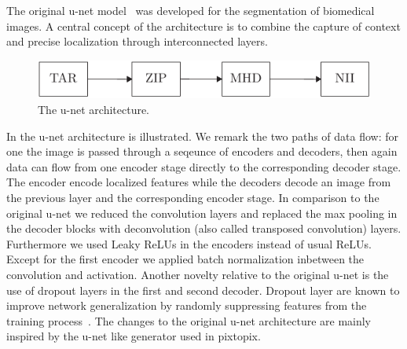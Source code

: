 The original u-net model~\cite{Ronneberger15} was developed for the
segmentation of biomedical images. A central concept of the architecture is to
combine the capture of context and precise localization through interconnected
layers.
\begin{figure}[h]
  \centering
  \includegraphics[page=3,width=.8\linewidth]{figure/diagrams.pdf}
  \caption{The u-net architecture.
  }\label{fig:unet:gen}
\end{figure}
In  the u-net architecture is illustrated. We remark the
two paths of data flow: for one the image is passed through a seqeunce of
encoders and decoders, then again data can flow from one encoder stage
directly to the corresponding decoder stage. The encoder encode localized
features while the decoders decode an image from the previous layer and the
corresponding encoder stage.
In comparison to the original u-net we reduced the convolution layers and
replaced the max pooling in the decoder blocks with deconvolution (also called
transposed convolution) layers. Furthermore we used Leaky ReLUs in the
encoders instead of usual ReLUs. Except for the first encoder we applied batch
normalization inbetween the convolution and activation. Another novelty
relative to the original u-net is the use of dropout layers in the first and
second decoder. Dropout layer are known to improve network generalization by
randomly suppressing features from the training process~\cite{Srivastava2014}.
The changes to the original u-net architecture are mainly inspired by the
u-net like generator used in pixtopix.
